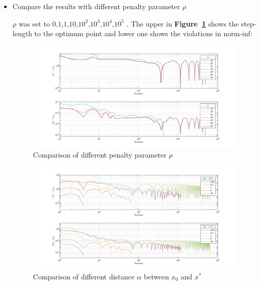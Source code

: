 \documentclass{article}
\begin{document}
\begin{itemize}
    \item Compare the results with different penalty parameter $\rho$
    
$\rho$ was set to $0.1$,$1$,$10$,$10^2$,$10^3$,$10^4$,$10^5$
. The upper in \textbf{Figure~\ref{fig:different penalty parameter}} shows the step-length to the optimum point and lower one shows the violations in norm-inf:
        \begin{figure}[hbt!]
         \begin{center}
            \includegraphics[width=1\textwidth]{Simulation_Results/comparision of different rho.pdf}
            \caption{Comparison of different penalty parameter $\rho$}
            \label{fig:different penalty parameter}
         \end{center}
        \end{figure}
         \begin{figure}[hbt!]
         \begin{center}
            \includegraphics[width=1\textwidth]{Simulation_Results/comparision of different initial points.pdf}
            \caption{Comparison of different distance $\alpha$ between $x_0$ and $x^\ast$}
            \label{fig:different distance}
         \end{center}
        \end{figure}           


\end{itemize}
\end{document}
